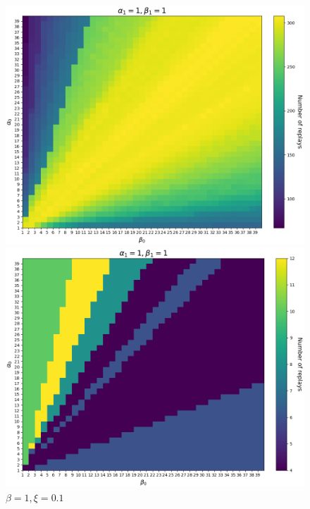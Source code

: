 \documentclass{article}
\begin{document}
\begin{figure}[ht!]
    \begin{minipage}{0.49\textwidth}
        \centering
        \includegraphics[width=1\textwidth]{../../../../bandit/data/convergence/num_replays/temp1/num_horizon4_alpha1_beta1_xi0001_temp1.png}
        \caption{$\beta=1, \xi=0.001$}
    \end{minipage}%
    \begin{minipage}{0.49\textwidth}
        \centering
        \includegraphics[width=1\textwidth]{../../../../bandit/data/convergence/num_replays/temp1/num_horizon4_alpha1_beta1_xi01_temp1.png}
        \caption{$\beta=1, \xi=0.1$}
    \end{minipage}
\end{figure}
\end{document}
